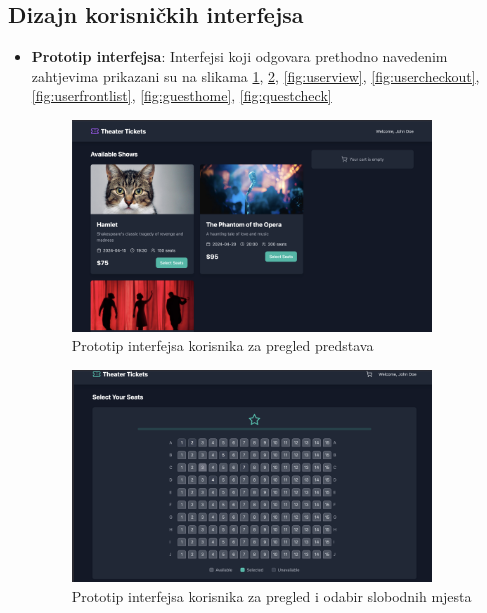 \subsection{Dizajn korisničkih interfejsa}  
\begin{itemize}  
    \item \textbf{Prototip interfejsa}: Interfejsi koji odgovara prethodno navedenim zahtjevima prikazani su na slikama \ref{fig:userfront}, \ref{fig:userselect}, \ref{fig:userview}, \ref{fig:usercheckout}, \ref{fig:userfrontlist},  \ref{fig:guesthome}, \ref{fig:questcheck}
\begin{figure}[H]
    \centering
    \includegraphics[width=0.9\textwidth]{Slike/FZ2ui/userfront.png}
    \caption{Prototip interfejsa korisnika za pregled predstava}
    \label{fig:userfront}
\end{figure} 
\begin{figure}[H]
    \centering
    \includegraphics[width=0.9\textwidth]{Slike/FZ2ui/userselect.png}
    \caption{Prototip interfejsa korisnika za pregled i odabir slobodnih mjesta}
    \label{fig:userselect}
\end{figure}
\begin{figure}[H]
    \centering

\end{figure}
\end{itemize}
